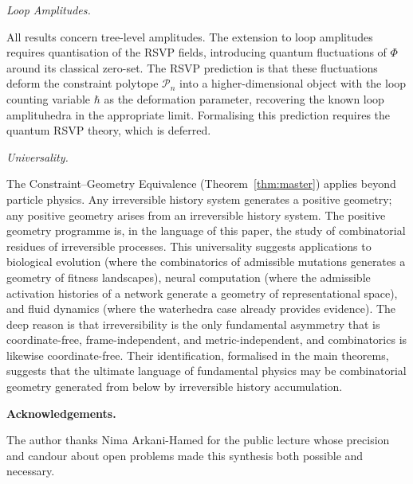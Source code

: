 \documentclass[12pt, oneside]{amsart}
\theoremstyle{plain}
\theoremstyle{definition}
\theoremstyle{remark}
\newcommand{\Phif}{\Phi}
\begin{document}
\medskip\noindent\textit{Loop Amplitudes.}

All results concern tree-level amplitudes. The extension to loop amplitudes requires quantisation of the RSVP fields, introducing quantum fluctuations of $\Phif$ around its classical zero-set. The RSVP prediction is that these fluctuations deform the constraint polytope $\mathcal{P}_n$ into a higher-dimensional object with the loop counting variable $\hbar$ as the deformation parameter, recovering the known loop amplituhedra in the appropriate limit. Formalising this prediction requires the quantum RSVP theory, which is deferred.

\medskip\noindent\textit{Universality.}

The Constraint--Geometry Equivalence (Theorem~\ref{thm:master}) applies beyond particle physics. Any irreversible history system generates a positive geometry; any positive geometry arises from an irreversible history system. The positive geometry programme is, in the language of this paper, the study of combinatorial residues of irreversible processes. This universality suggests applications to biological evolution (where the combinatorics of admissible mutations generates a geometry of fitness landscapes), neural computation (where the admissible activation histories of a network generate a geometry of representational space), and fluid dynamics (where the waterhedra case already provides evidence). The deep reason is that irreversibility is the only fundamental asymmetry that is coordinate-free, frame-independent, and metric-independent, and combinatorics is likewise coordinate-free. Their identification, formalised in the main theorems, suggests that the ultimate language of fundamental physics may be combinatorial geometry generated from below by irreversible history accumulation.

\bigskip\noindent\textbf{Acknowledgements.}

The author thanks Nima Arkani-Hamed for the public lecture whose precision and candour about open problems made this synthesis both possible and necessary.



\end{document}

